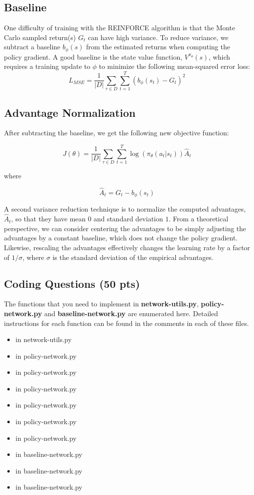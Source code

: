 \documentclass{article}
\begin{document}
\subsection{Baseline}
One difficulty of training with the REINFORCE algorithm is that the Monte Carlo sampled return(s) $G_t$ can have high variance. To reduce variance, we subtract a baseline $b_{\phi}(s)$ from the estimated returns when computing the policy gradient. A good baseline is the state value function, $V^{\pi_\theta}(s)$, which requires a training update to $\phi$ to minimize the following mean-squared error loss:
\[ L_{MSE} = \frac{1}{|D|} \sum_{\tau \in D} \sum_{t=1}^T (b_{\phi}(s_t) - G_t)^2\]
\subsection{Advantage Normalization}

After subtracting the baseline, we get the following new objective function:

\[ J(\theta) = \frac{1}{|D|} \sum_{\tau \in D} \sum_{t=1}^T \log(\pi_\theta(a_t|s_t)) \hat{A}_t \]

where

\[\hat{A}_t=G_t - b_{\phi}(s_t)\]

A second variance reduction technique is to normalize the computed advantages, $\hat{A}_t$, so that they have mean $0$ and standard deviation $1$. From a theoretical perspective, we can consider centering the advantages to be simply adjusting the advantages by a constant baseline, which does not change the policy gradient. Likewise, rescaling the advantages effectively changes the learning rate by a factor of $1/\sigma$, where $\sigma$ is the standard deviation of the empirical advantages.

\subsection{Coding Questions (50 pts)}
The functions that you need to implement in \textbf{network-utils.py}, \textbf{policy-network.py} and \textbf{baseline-network.py} are enumerated here. Detailed instructions for each function can be found in the comments in each of these files.
\begin{itemize}
\item{} in network-utils.py
\item{} in policy-network.py
\item{} in policy-network.py
\item{} in policy-network.py
\item{} in policy-network.py
\item{} in policy-network.py
\item{} in policy-network.py
\item{} in baseline-network.py
\item{} in baseline-network.py
\item{} in baseline-network.py
\end{itemize}
\end{document}
